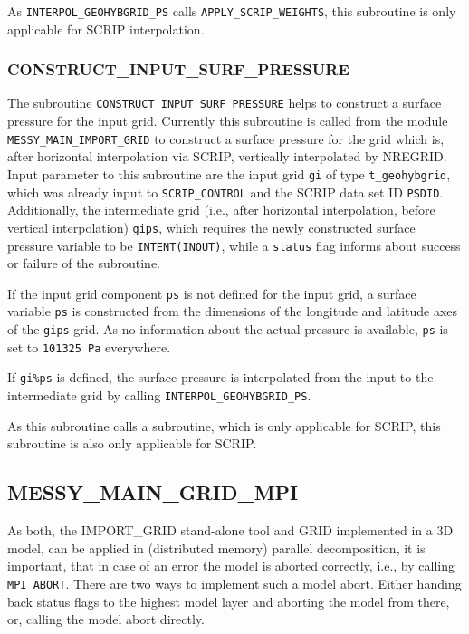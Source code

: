 \documentclass[11pt,twoside]{article}
\begin{document}
As \verb|INTERPOL_GEOHYBGRID_PS|
calls \verb|APPLY_SCRIP_WEIGHTS|, this subroutine is only 
applicable for SCRIP interpolation.

\subsubsection{CONSTRUCT\_INPUT\_SURF\_PRESSURE\label{CONSTISPS}}
The subroutine \verb|CONSTRUCT_INPUT_SURF_PRESSURE| helps to construct
a surface pressure for the input grid. Currently this subroutine is
called from the module \verb|MESSY_MAIN_IMPORT_GRID| to construct a
surface pressure for the grid which is, after horizontal interpolation
via SCRIP, vertically interpolated by NREGRID.
Input parameter to this subroutine are the input grid \verb|gi| of
type \verb|t_geohybgrid|, which was already input
to \verb|SCRIP_CONTROL| and the SCRIP data set
ID \verb|PSDID|. Additionally, the intermediate grid (i.e., after
horizontal interpolation, before vertical interpolation) \verb|gips|,
 which requires the newly
constructed surface pressure variable to be \verb|INTENT(INOUT)|, while
a \verb|status| flag informs about success or failure of the subroutine.

If the input grid component \verb|ps| is not defined for the input
grid, a surface variable \verb|ps| is constructed from the dimensions
of the longitude and latitude axes of the \verb|gips| grid. As no
information about the actual pressure is available, \verb|ps| is set
to \verb|101325 Pa| everywhere.

If \verb|gi%ps| is defined,  the surface pressure is interpolated from
the input to the intermediate grid by calling \verb|INTERPOL_GEOHYBGRID_PS|.

As this subroutine calls a subroutine, which is only applicable
for SCRIP, this subroutine is also only applicable for SCRIP.

\clearpage
\subsection{MESSY\_MAIN\_GRID\_MPI\label{MMGMPI}}
As both, the IMPORT\_GRID stand-alone tool and GRID implemented in a
3D model, can 
be applied in (distributed memory) parallel decomposition, it is
important, that in case of an error the 
model is aborted correctly, i.e., by calling \verb|MPI_ABORT|.
There are two ways to implement such a model abort. Either handing back
status flags to the highest model layer and aborting the model from
there, or, calling the model abort directly. 
\end{document}
